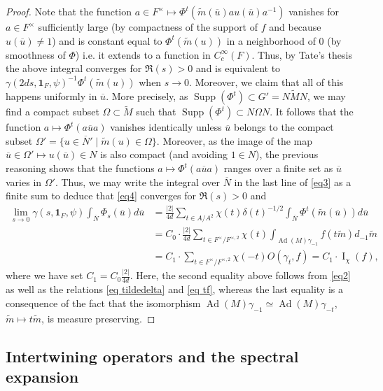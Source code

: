 \documentclass[12pt]{article}
\numberwithin{equation}{section}
\def\tM{\widetilde{M}}
\def\tm{\widetilde{m}}
\def\ou{\overline{u}}
\def\oN{\overline{N}}
\DeclareMathOperator{\Ad}{Ad}
\DeclareMathOperator{\Supp}{Supp}
\DeclareMathOperator{\rI}{\mathrm{I}}
\begin{document}
\begin{proof}
		Note that the function $a\in F^\times \mapsto \Phi^t(\tm(\ou) au(\ou)a^{-1})$ vanishes for $a\in F^\times$ sufficiently large (by compactness of the support of $f$ and because $u(\ou)\neq 1$) and is constant equal to $\Phi^t(\tm(u))$ in a neighborhood of $0$ (by smoothness of $\Phi$) i.e. it extends to a function in $C_c^\infty(F)$. Thus, by Tate's thesis the above integral converges for $\Re(s)>0$ and is equivalent to $\gamma(2ds,\mathbf{1}_F,\psi)^{-1}\Phi^t(\tm(u))$ when $s\to 0$. Moreover, we claim that all of this happens uniformly in $\ou$. More precisely, as $\Supp(\Phi^t)\subset G'=N \tM N$, we may find a compact subset $\Omega\subset \tM$ such that $\Supp(\Phi^t)\subset N \Omega N$. It follows that the function $a\mapsto \Phi^t(a\ou a)$ vanishes identically unless $\ou$ belongs to the compact subset $\Omega'=\{u\in \oN'\mid \tm(u)\in \Omega \}$. Moreover, as the image of the map $\ou\in \Omega'\mapsto u(\ou)\in N$ is also compact (and avoiding $1\in N$), the previous reasoning shows that the functions $a\mapsto \Phi^t(a\ou a)$ ranges over a finite set as $\ou$ varies in $\Omega'$. Thus, we may write the integral over $\oN$ in the last line of \eqref{eq3} as a finite sum to deduce that \eqref{eq4} converges for $\Re(s)>0$ and
		\[\begin{aligned}
			\displaystyle \lim\limits_{s\to 0} \gamma(s,\mathbf{1}_F,\psi)\int_{\oN} \Phi_s(\ou)d\ou & = \frac{\lvert 2\rvert}{4d}\sum_{t\in A/A^2} \chi(t) \delta(t)^{-1/2} \int_{\oN} \Phi^t(\tm(\ou)) d\ou \\
			& = C_0\cdot \frac{\lvert 2\rvert}{4d} \sum_{t\in F^\times/F^{\times,2}} \chi(t) \int_{\Ad(M)\gamma_{-1}} f(t \tm) d_{-1}\tm \\
			& = C_1\cdot \sum_{t\in F^\times/F^{\times,2}} \chi(-t) O(\gamma_t,f)=C_1 \cdot \rI_{\chi}(f),
		\end{aligned}\]
		where we have set $C_1= C_0\frac{\lvert 2\rvert}{4d} $. Here, the second equality above follows from \eqref{eq2} as well as the relations \eqref{eq tildedelta} and \eqref{eq tf}, whereas the last equality is a consequence of the fact that the isomorphism $\Ad(M)\gamma_{-1}\simeq \Ad(M)\gamma_{-t}$, $\tm\mapsto t\tm$, is measure preserving.
	\end{proof}
	
	\subsection{Intertwining operators and the spectral expansion}\label{IO and spectral exp}
	
\end{document}
